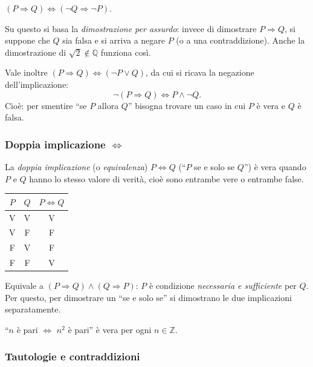 \documentclass[11pt,a4paper]{article}
\newcommand{\V}{\textsf{V}}
\newcommand{\F}{\textsf{F}}
\begin{document}
\begin{teorema}[Contronominale]
$(P \Rightarrow Q) \iff (\neg Q \Rightarrow \neg P)$.
\end{teorema}

Su questo si basa la \emph{dimostrazione per assurdo}: invece di dimostrare
$P \Rightarrow Q$, si suppone che $Q$ sia falsa e si arriva a negare $P$
(o a una contraddizione). Anche la dimostrazione di $\sqrt{2} \notin
\mathbb{Q}$ funziona così.

Vale inoltre $(P \Rightarrow Q) \iff (\neg P \lor Q)$, da cui si ricava la
negazione dell'implicazione:
\[
\neg(P \Rightarrow Q) \iff P \land \neg Q.
\]
Cioè: per smentire ``se $P$ allora $Q$'' bisogna trovare un caso in cui
$P$ è vera e $Q$ è falsa.

\subsubsection{Doppia implicazione $\Leftrightarrow$}

\begin{definizione}
La \emph{doppia implicazione} (o \emph{equivalenza}) $P \Leftrightarrow Q$
(``$P$ se e solo se $Q$'') è vera quando $P$ e $Q$ hanno lo stesso valore
di verità, cioè sono entrambe vere o entrambe false.
\end{definizione}

\begin{center}
\begin{tabular}{cc|c}
$P$ & $Q$ & $P \Leftrightarrow Q$ \\ \hline
\V & \V & \V \\
\V & \F & \F \\
\F & \V & \F \\
\F & \F & \V
\end{tabular}
\end{center}

Equivale a $(P \Rightarrow Q) \land (Q \Rightarrow P)$: $P$ è condizione
\emph{necessaria e sufficiente} per $Q$. Per questo, per dimostrare un
``se e solo se'' si dimostrano le due implicazioni separatamente.

\begin{esempio}
``$n$ è pari $\Leftrightarrow$ $n^2$ è pari'' è vera per ogni
$n \in \mathbb{Z}$.
\end{esempio}

\subsubsection{Tautologie e contraddizioni}
\end{document}
